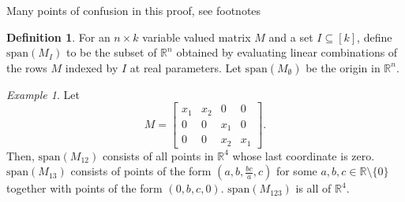 \documentclass[11pt]{article}
\theoremstyle{remark}
\newtheorem{eg}[thm]{Example}
\theoremstyle{definition}
\newtheorem{dfn}[thm]{Definition}
\begin{document}
\begin{appendices}

{\color{red}Many points of confusion in this proof, see footnotes}

\begin{dfn}
For an $n \times k$ variable valued matrix $M$ and a set $I \subseteq [k]$, define $\mathrm{span}(M_I)$ to be the subset of $\mathbb{R}^n$ obtained by evaluating linear combinations of the rows $M$ indexed by $I$ at real parameters. Let $\mathrm{span}(M_{\emptyset})$ be the origin in $\mathbb{R}^n$.
\end{dfn}

\begin{eg}
Let
%
\begin{displaymath}
M =
\begin{bmatrix}x_1 & x_2 & 0 & 0 \\
0 & 0 & x_1 & 0 \\
0 & 0 & x_2 & x_1 \end{bmatrix}.
\end{displaymath}
\noindent
Then, $\mathrm{span}(M_{12})$ consists of all points in $\mathbb{R}^4$ whose last coordinate is zero. $\mathrm{span}(M_{13})$ consists of points of the form $(a,b,\frac{bc}{a},c)$ for some $a,b,c \in \mathbb{R} \setminus \{0\}$ together with points of the form $(0,b,c,0)$. $\mathrm{span}(M_{123})$ is all of $\mathbb{R}^4$.
\end{eg}


\end{appendices}
\end{document}
